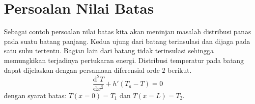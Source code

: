 \section{Persoalan Nilai Batas}

Sebagai contoh persoalan nilai batas kita akan meninjau masalah distribusi
panas pada suatu batang panjang. Kedua ujung dari batang terinsulasi dan
dijaga pada satu suhu tertentu. Bagian lain dari batang tidak terinsulasi
sehingga memungkikan terjadinya pertukaran energi.
Distribusi temperatur pada batang dapat dijelaskan dengan persamaan diferensial
orde 2 berikut.
\begin{equation}
\frac{\mathrm{d}^2 T}{\mathrm{d}x^2} + h'(T_a - T) = 0
\label{eq:chapra_eq_27_1}
\end{equation}
dengan syarat batas: $T(x=0) = T_1$ dan $T(x=L) = T_2$.





